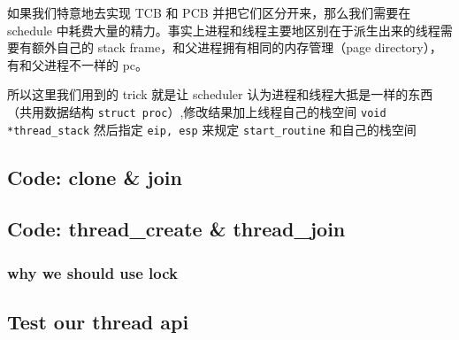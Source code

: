 如果我们特意地去实现 TCB 和 PCB 并把它们区分开来，那么我们需要在 schedule 中耗费大量的精力。事实上进程和线程主要地区别在于派生出来的线程需要有额外自己的 stack frame，和父进程拥有相同的内存管理（page directory），有和父进程不一样的 pc。

所以这里我们用到的 trick 就是让 scheduler 认为进程和线程大抵是一样的东西（共用数据结构 \texttt{struct proc}）,修改结果加上线程自己的栈空间 \texttt{void *thread\_stack} 然后指定 \texttt{eip, esp} 来规定 \texttt{start\_routine} 和自己的栈空间

\subsection{Code: clone \& join}



\subsection{Code: thread\_create \& thread\_join}

\subsubsection{why we should use lock}

\subsection{Test our thread api}